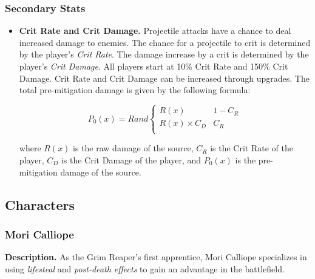 \documentclass[10pt, a4paper]{article}
\begin{document}
  	\subsubsection{Secondary Stats}
  	
  	\begin{itemize}
  	 \item \textbf{Crit Rate and Crit Damage.} Projectile attacks have a chance to deal increased damage to enemies. The chance for a projectile to crit is determined by the player's \textit{Crit Rate}. The damage increase by a crit is determined by the player's \textit{Crit Damage}. All players start at 10\% Crit Rate and 150\% Crit Damage. Crit Rate and Crit Damage can be increased through upgrades. The total pre-mitigation damage is given by the following formula:

  	 \[
	  	 P_0(x) = Rand\begin{cases}
	  	 	R(x) & 1 - C_R\\
	  	 	R(x) \times C_D & C_R \\
	  	 \end{cases}
  	 \]
  	 
  	 where $R(x)$ is the raw damage of the source, $C_R$ is the Crit Rate of the player, $C_D$ is the Crit Damage of the player, and $P_0(x)$ is the pre-mitigation damage of the source.
  	 
  	\end{itemize}
  
  	\subsection{Characters} \label{Characters}
  	
  	\subsubsection{Mori Calliope}
  	
  	\textbf{Description.} As the Grim Reaper's first apprentice, Mori Calliope specializes in using \textit{lifesteal} and \textit{post-death effects} to gain an advantage in the battlefield.\\
  	
\end{document}
